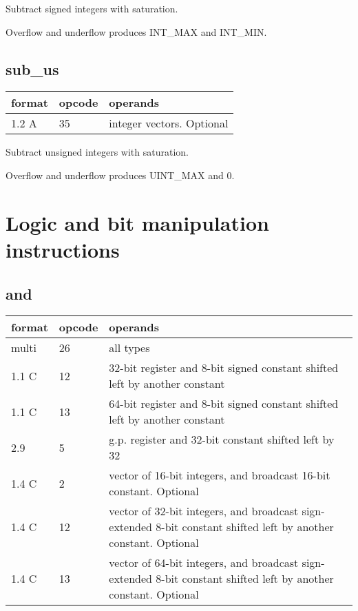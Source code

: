 \documentclass[forwardcom.tex]{subfiles}
\begin{document}
Subtract signed integers with saturation.

Overflow and underflow produces INT\_MAX and INT\_MIN.
\vv

\subsection{sub\_us}
\label{table:subUsInstruction}
\begin{tabular}{|p{12mm}|p{15mm}|p{100mm}|}
\hline
\bfseries format & \bfseries opcode & \bfseries operands \\ \hline
1.2 A & 35 & integer vectors. Optional \\ \hline
\end{tabular}
\vv

Subtract unsigned integers with saturation.

Overflow and underflow produces UINT\_MAX and 0.
\vv

\section{Logic and bit manipulation instructions}

\subsection{and}
\label{table:andInstruction}
\begin{tabular}{|p{12mm}|p{15mm}|p{100mm}|}
\hline
\bfseries format & \bfseries opcode & \bfseries operands \\ \hline
multi & 26 & all types \\ \hline
1.1 C & 12 & 32-bit register and 8-bit signed constant shifted left by another constant \\ \hline
1.1 C & 13 & 64-bit register and 8-bit signed constant shifted left by another constant \\ \hline
2.9   &  5 & g.p. register and 32-bit constant shifted left by 32 \\ \hline
1.4 C &  2 & vector of 16-bit integers, and broadcast 16-bit constant. Optional \\ \hline
1.4 C & 12 & vector of 32-bit integers, and broadcast sign-extended 8-bit constant shifted left by another constant. Optional \\ \hline
1.4 C & 13 & vector of 64-bit integers, and broadcast sign-extended 8-bit constant shifted left by another constant. Optional \\ \hline
\end{tabular}
\vv
\end{document}
